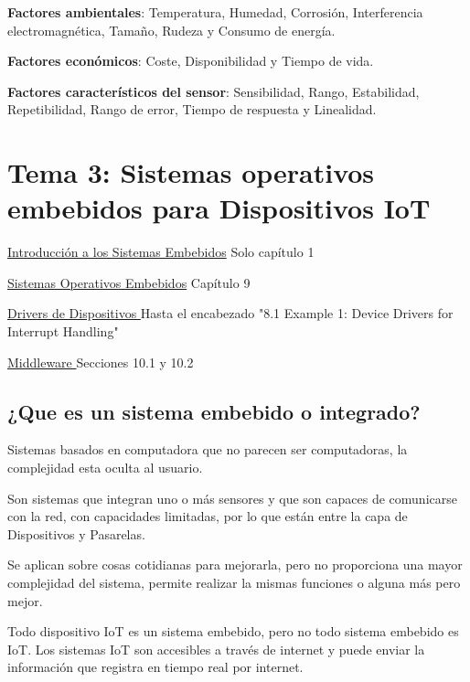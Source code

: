 \documentclass[12pt]{report} %
\begin{document}
\textbf{Factores ambientales}: Temperatura, Humedad, Corrosión,
Interferencia electromagnética, Tamaño, Rudeza y Consumo de energía.

\textbf{Factores económicos}: Coste, Disponibilidad y Tiempo de vida.

\textbf{Factores característicos del sensor}: Sensibilidad, Rango,
Estabilidad, Repetibilidad, Rango de error, Tiempo de respuesta y
Linealidad.

\chapter{Tema 3: Sistemas operativos embebidos para Dispositivos
IoT}

\href{https://learning.oreilly.com/library/view/embedded-systems-architecture/9780123821966/xhtml/CHP001.html#CHP001titl}{Introducción a los Sistemas Embebidos} Solo capítulo 1

\href{https://learning.oreilly.com/library/view/embedded-systems-architecture/9780123821966/xhtml/CHP009.html#CHP009titl}{Sistemas
Operativos Embebidos} Capítulo 9

\href{https://learning.oreilly.com/library/view/embedded-systems-architecture/9780123821966/xhtml/CHP008.html#CHP008titl}{Drivers de Dispositivos
} Hasta el encabezado "8.1 Example 1: Device Drivers for Interrupt Handling"

\href{https://learning.oreilly.com/library/view/embedded-systems-architecture/9780123821966/xhtml/CHP010.html#CHP010titl}{Middleware
} Secciones 10.1 y 10.2

\section{¿Que es un sistema embebido o
integrado?}

Sistemas basados en computadora que no parecen ser computadoras, la complejidad esta oculta al usuario.

Son sistemas que integran uno o más sensores y que son capaces de
comunicarse con la red, con capacidades limitadas, por lo que están
entre la capa de Dispositivos y Pasarelas.

Se aplican sobre cosas cotidianas para mejorarla, pero no
proporciona una mayor complejidad del sistema, permite realizar la
mismas funciones o alguna más pero mejor.

Todo dispositivo IoT es un sistema embebido, pero no todo sistema
embebido es IoT. Los sistemas IoT son accesibles a través de internet y
puede enviar la información que registra en tiempo real por internet.
\end{document}

